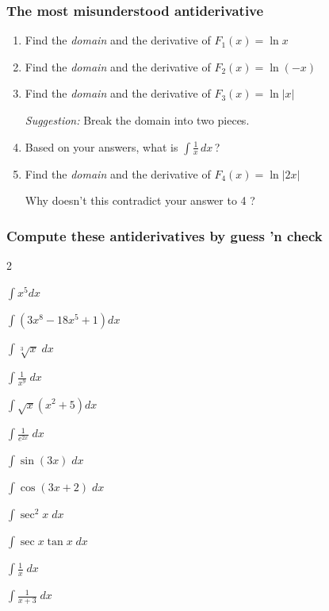 \begin{frame}[t]
	\fontsize{13}{13}\selectfont
	\frametitle{The most misunderstood antiderivative}
	\begin{enumerate}
		\item Find the \emph{domain} and the derivative of \;
			$\displaystyle F_{1}(x) = \ln x$
			\vspace{.1cm}

		\item Find the \emph{domain} and the derivative of \;
			$\displaystyle F_{2}(x) = \ln (-x)$
			\vspace{.1cm}

		\item Find the \emph{domain} and the derivative of \;
			$\displaystyle F_{3}(x) = \ln |x|$
			\vspace{.1cm}

			\emph{Suggestion:} Break the domain into two pieces.
			\vspace{.1cm}

		\item \label{qu:ln} Based on your answers, what is
			$\displaystyle \int \frac{1}{x}\,dx \,$?
			\vspace{.1cm}

		\item Find the \emph{domain} and the derivative of \;
			$\displaystyle F_{4}(x) = \ln |2x|$
			\vspace{.1cm}

			Why doesn't this contradict your answer to {\color{blue} 4} ?
	\end{enumerate}
\end{frame}

\begin{frame}[t]
	\fontsize{13}{13}\selectfont
	\frametitle{Compute these antiderivatives by guess 'n check}

	\begin{enumerate}
	\end{enumerate}
\end{frame}

